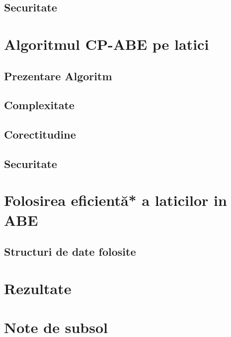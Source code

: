 \documentclass{article}
\begin{document}
\subsection{Securitate}
\section{Algoritmul CP-ABE pe latici}
\subsection{Prezentare Algoritm}
\subsection{Complexitate}
\subsection{Corectitudine}
\subsection{Securitate}
\section{Folosirea eficientă* a laticilor in ABE}
\subsection{Structuri de date folosite}
\section{Rezultate}
\section{Note de subsol}
\end{document}
